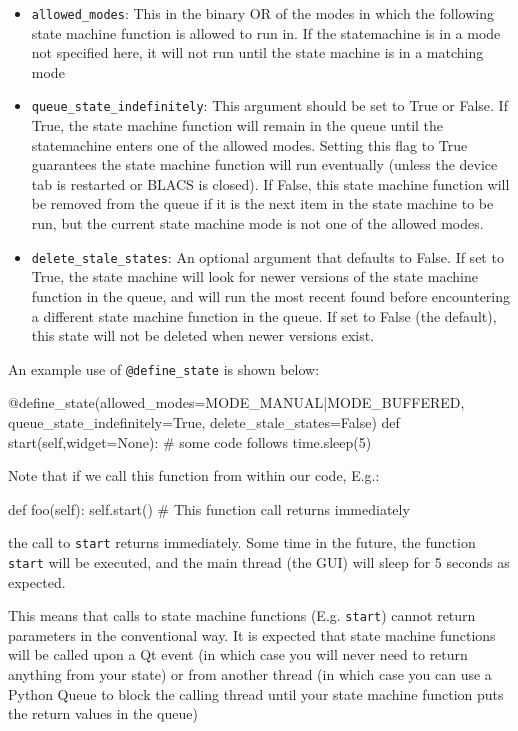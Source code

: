 \documentclass[12pt]{article}
\begin{document}
\begin{itemize}
	\item \texttt{allowed\_modes}: This in the binary OR of the modes in which the following state machine function is allowed to run in. If the statemachine is in a mode not specified here, it will not run until the state machine is in a matching mode
	\item \texttt{queue\_state\_indefinitely}: This argument should be set to True or False.
	If True, the state machine function will remain in the queue until the statemachine enters one of the allowed modes. 
	Setting this flag to True guarantees the state machine function will run eventually (unless the device tab is restarted or BLACS is closed). 
	If False, this state machine function will be removed from the queue if it is the next item in the state machine to be run, but the current state machine mode is not one of the allowed modes.
	\item \texttt{delete\_stale\_states}: An optional argument that defaults to False. If set to True, the state machine will look for newer versions of the state machine function in the queue, and will run the most recent found before encountering a different state machine function in the queue. If set to False (the default), this state will not be deleted when newer versions exist.
\end{itemize}

An example use of \texttt{@define\_state} is shown below:
\begin{python}
    @define_state(allowed_modes=MODE_MANUAL|MODE_BUFFERED,
                  queue_state_indefinitely=True,
                  delete_stale_states=False)
    def start(self,widget=None):
        # some code follows
        time.sleep(5)
\end{python}

Note that if we call this function from within our code, E.g.:
\begin{python}
    def foo(self):
        self.start() # This function call returns immediately
\end{python}
the call to \texttt{start} returns immediately. Some time in the future, the function \texttt{start} will be executed, and the main thread (the GUI) will sleep for 5 seconds as expected.

This means that calls to state machine functions (E.g. \texttt{start}) cannot return parameters in the conventional way. It is expected that state machine functions will be called upon a Qt event (in which case you will never need to return anything from your state) or from another thread (in which case you can use a Python Queue to block the calling thread until your state machine function puts the return values in the queue)
\end{document}
